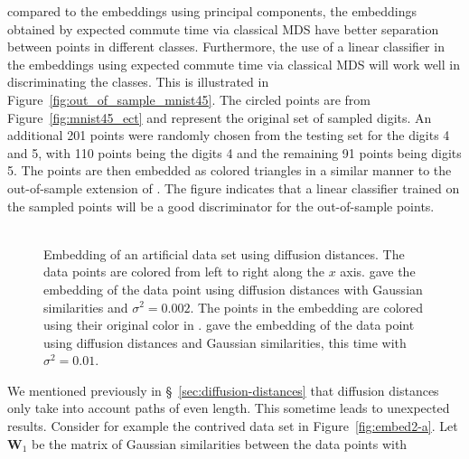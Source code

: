 compared to the embeddings using principal components, the embeddings
obtained by expected commute time via classical MDS have better
separation between points in different classes.  Furthermore, the use
of a linear classifier in the embeddings using expected commute time
via classical MDS will work well in discriminating the classes.  This
is illustrated in Figure~\ref{fig:out_of_sample_mnist45}. The circled
points are from Figure~\ref{fig:mnist45_ect} and represent the
original set of sampled digits. An additional 201 points were randomly
chosen from the testing set for the digits 4 and 5, with 110 points
being the digits 4 and the remaining 91 points being digits 5. The
points are then embedded as colored triangles in a similar manner to
the out-of-sample extension of
\citet{bengio04:_out_lle_isomap_mds_eigen}. The figure indicates that
a linear classifier trained on the sampled points will be a good
discriminator for the out-of-sample points. \\ \\
\begin{figure}[htbp]
  \centering
    \hspace{8pt}
        \caption{Embedding of an artificial data set
           using diffusion distances. The data
          points are colored from left to right along the $x$
          axis.  gave the embedding of the data
          point using diffusion distances with Gaussian similarities
          and $\sigma^{2} = 0.002$. The points in the embedding are
          colored using their original color in
          .  gave the
          embedding of the data point using diffusion distances and
          Gaussian similarities, this time with $\sigma^{2} = 0.01$. }
  \label{fig:embed2}
\end{figure}
\noindent We mentioned previously in \S~\ref{sec:diffusion-distances} that
diffusion distances only take into account paths of even length. This
sometime leads to unexpected results. Consider for example the
contrived data set in Figure~\ref{fig:embed2-a}. Let $\mathbf{W}_1$ be
the matrix of Gaussian similarities between the data points with
